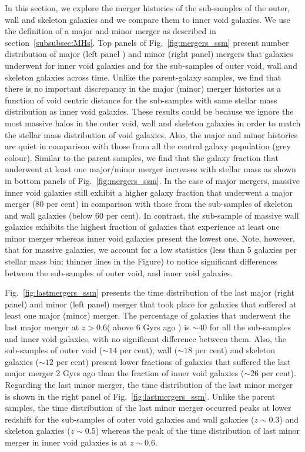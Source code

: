 \documentclass[a4paper,fleqn,usenatbib,letter]{mnras}
\begin{document}
In this section, we explore the merger histories of the sub-samples of the outer, wall and skeleton galaxies and we  compare them to inner void galaxies.
 We use the definition of a major and minor merger as described in section~\ref{subsubsec:MHs}. 
Top panels of Fig.~\ref{fig:mergers_ssm} present number distribution of major (left panel ) and minor (right panel) mergers that galaxies underwent for inner void galaxies and for the sub-samples of outer void, wall and skeleton galaxies across time. Unlike the parent-galaxy samples, we find that there is no important discrepancy in the major (minor) merger histories as a function of void centric distance  for the sub-samples with same stellar mass distribution as inner void galaxies. These results could be because we ignore the most massive halos in the outer void, wall and skeleton galaxies  in order to match the stellar mass distribution of void galaxies. Also, the major and minor histories are quiet in comparison with those from all the central galaxy population (grey colour).  Similar to the parent samples, we find that the galaxy fraction that underwent at least one major/minor merger increases with stellar mass as shown in  bottom panels  of Fig.~\ref{fig:mergers_ssm}. In the case of major mergers,  massive inner void galaxies still exhibit a higher galaxy fraction  that underwent a major merger (80 per cent) in comparison with those from the sub-samples of skeleton and wall galaxies (below 60  per cent). In contrast, the sub-sample of massive wall galaxies exhibits the highest fraction of galaxies that experience at least one minor merger  whereas inner void galaxies present the lowest one. Note, however, that for massive galaxies, we account for a low statistics (less than 5 galaxies per stellar mass bin; thinner lines in the Figure) to notice  significant differences between the sub-samples of outer void,  and inner void galaxies. 

Fig.~\ref{fig:lastmergers_ssm} presents the time distribution of the last major (right panel) and minor (left panel) merger that took place for galaxies that suffered at least one major (minor) merger. The percentage of galaxies that underwent the last major merger at $z>0.6$( above 6 Gyrs ago ) is $\sim 40$ for all the sub-samples and inner void galaxies, with no significant difference between them. Also, the sub-samples of outer void ($\sim 14$ per cent), wall ($\sim 18$ per cent) and skeleton galaxies ($\sim 12$ per cent) present lower fractions of galaxies that suffered the last major merger 2 Gyrs ago than the fraction of inner void galaxies ($\sim 26$ per cent). Regarding the last minor merger, the time distribution of the last minor merger is shown in the right panel of Fig.~\ref{fig:lastmergers_ssm}.  Unlike the parent samples, the time distribution of the last minor merger occurred peaks at lower redshift for the sub-samples of  outer void galaxies and wall galaxies ($z\sim 0.3$) and skeleton galaxies ($z\sim0.5$) whereas the peak of the time distribution of last minor merger in inner void galaxies is at $z\sim 0.6$.   
\end{document}

